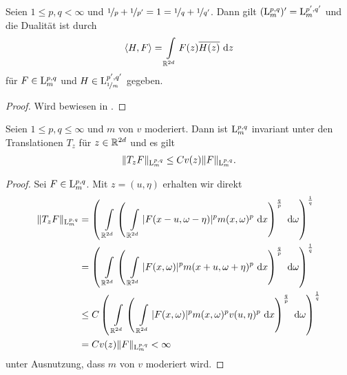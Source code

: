 \begin{sz}\label{th:dualtiy_mixed_norm}
	Seien $1 \leq  p,q < \infty $ und $ \nicefrac{1}{p} + \nicefrac{1}{p^\prime}=1=
	\nicefrac{1}{q} + \nicefrac{1}{q^\prime} $.
	Dann gilt $ (\mathrm{L}^{p,q}_m)^\prime = \mathrm{L}^{p^\prime,q^\prime}_m $ und die Dualität ist durch
	\begin{align}\label{eq:dualtiy_mixed_norm}
	\langle H,F \rangle
	=
	\int 
	\limits_{\mathbb{R}^{2d}} F(z) \overline{H(z)} \text{ d} z 
	\end{align} 
	für $ F \in \mathrm{L}^{p,q}_m $ und $ H \in \mathrm{L}^{p^\prime,q^\prime}_{\nicefrac{1}{m}}  $ gegeben.
	
\end{sz}

\begin{proof}
	Wird bewiesen in \cite{benedek1961}.
\end{proof}

\newpage

\begin{sz}
	Seien $ 1 \leq p,q \leq \infty  $ und $ m $ von $ v $ moderiert. Dann ist $  \mathrm{L}^{p,q}_m  $ invariant unter den Translationen $ T_z $ für $ z \in \mathbb{R}^{2d} $ und es gilt
	\begin{align}\label{eq:invariance_translation_mixed_norm}
	\| T_z F \|_{ \mathrm{L}^{p,q}_m }
	\leq C v(z)
	\| F \|_{\mathrm{L}^{p,q}_m}.
	\end{align}
\end{sz}

\begin{proof}
	Sei $ F \in \mathrm{L}^{p,q}_m $.
	Mit $ z = (u, \eta) $ erhalten wir direkt
	\begin{align*}
	\| T_z F \|_{\mathrm{L}^{p,q}_m}
	&= 
	\left(		
	\ \int \limits_{\mathbb{R}^{2d}} 
	\left(
	\ \int \limits_{\mathbb{R}^{2d}}
	|F(x - u ,\omega - \eta )|^p m(x,\omega)^p \text{ d} x 
	\right)^{\frac{q}{p}}
	\text{ d} \omega
	\right)^{\frac{1}{q}}\\
	&=
	\left(		
	\ \int \limits_{\mathbb{R}^{2d}} 
	\left(
	\ \int \limits_{\mathbb{R}^{2d}}
	|F(x,\omega)|^p m(x + u,\omega + \eta )^p \text{ d} x 
	\right)^{\frac{q}{p}}
	\text{ d} \omega
	\right)^{\frac{1}{q}}\\
	&\leq
	C \left(		
	\ \int \limits_{\mathbb{R}^{2d}} 
	\left(
	\ \int \limits_{\mathbb{R}^{2d}}
	|F(x,\omega)|^p m(x,\omega)^p v(u, \eta)^p \text{ d} x 
	\right)^{\frac{q}{p}}
	\text{ d} \omega
	\right)^{\frac{1}{q}}\\
	&=
	C v(z) \|  F \|_{\mathrm{L}^{p,q}_m} < \infty
	\end{align*}
	unter Ausnutzung, dass $ m $ von $ v $ moderiert wird.
\end{proof}

